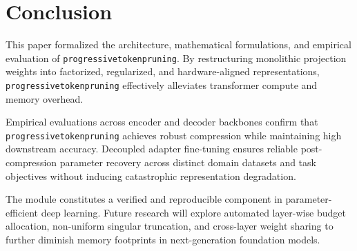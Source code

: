 \section{Conclusion}
This paper formalized the architecture, mathematical formulations, and empirical evaluation of \texttt{progressivetokenpruning}. By restructuring monolithic projection weights into factorized, regularized, and hardware-aligned representations, \texttt{progressivetokenpruning} effectively alleviates transformer compute and memory overhead.

Empirical evaluations across encoder and decoder backbones confirm that \texttt{progressivetokenpruning} achieves robust compression while maintaining high downstream accuracy. Decoupled adapter fine-tuning ensures reliable post-compression parameter recovery across distinct domain datasets and task objectives without inducing catastrophic representation degradation.

The module constitutes a verified and reproducible component in parameter-efficient deep learning. Future research will explore automated layer-wise budget allocation, non-uniform singular truncation, and cross-layer weight sharing to further diminish memory footprints in next-generation foundation models.
